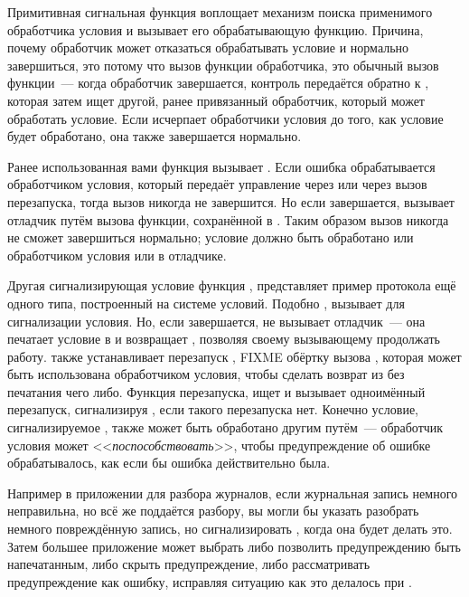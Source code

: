 Примитивная сигнальная функция  воплощает механизм поиска применимого
обработчика условия и вызывает его обрабатывающую функцию. Причина, почему обработчик
может отказаться обрабатывать условие и нормально завершиться, это потому что вызов
функции обработчика, это обычный вызов функции~--- когда обработчик завершается, контроль
передаётся обратно к , которая затем ищет другой, ранее привязанный
обработчик, который может обработать условие. Если  исчерпает обработчики
условия до того, как условие будет обработано, она также завершается нормально.

Ранее использованная вами функция  вызывает . Если ошибка
обрабатывается обработчиком условия, который передаёт управление через 
или через вызов перезапуска, тогда вызов  никогда не завершится. Но если
 завершается,  вызывает отладчик путём вызова функции,
сохранённой в . Таким образом вызов  никогда не сможет
завершиться нормально; условие должно быть обработано или обработчиком условия или в
отладчике.

Другая сигнализирующая условие функция , представляет пример протокола ещё
одного типа, построенный на системе условий. Подобно ,  вызывает
 для сигнализации условия. Но, если  завершается,  не
вызывает отладчик~--- она печатает условие в  и возвращает
, позволяя своему вызывающему продолжать работу.  также устанавливает
перезапуск , FIXME обёртку вызова , которая может быть
использована обработчиком условия, чтобы сделать возврат из  без печатания чего
либо. Функция  перезапуска, ищет и вызывает одноимённый перезапуск,
сигнализируя , если такого перезапуска нет. Конечно условие,
сигнализируемое , также может быть обработано другим путём~--- обработчик
условия может <<\textit{поспособствовать}>>, чтобы предупреждение об ошибке обрабатывалось,
как если бы ошибка действительно была.

Например в приложении для разбора журналов, если журнальная запись немного неправильна, но
всё же поддаётся разбору, вы могли бы указать  разобрать немного
повреждённую запись, но сигнализировать , когда она будет делать это. Затем
большее приложение может выбрать либо позволить предупреждению быть напечатанным, либо
скрыть предупреждение, либо рассматривать предупреждение как ошибку, исправляя ситуацию
как это делалось при .

